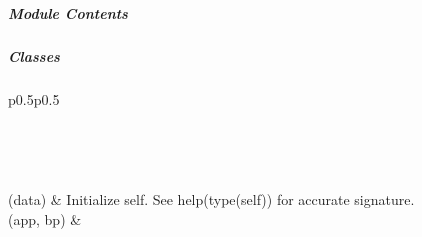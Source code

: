 \documentclass[letterpaper,10pt,english]{sphinxmanual}
\begin{document}
\subparagraph{Module Contents}
\label{\detokenize{autoapi/pine/backend/auth/eve/index:module-contents}}

\subparagraph{Classes}
\label{\detokenize{autoapi/pine/backend/auth/eve/index:classes}}

\begin{savenotes}\sphinxatlongtablestart\begin{longtable}[c]{p{0.5\linewidth}p{0.5\linewidth}}
\hline

\endfirsthead

%
{}\\
\hline

\endhead

\hline
{}\\
\endfoot

\endlastfoot

{\hyperref[\detokenize{autoapi/pine/backend/auth/eve/index:pine.backend.auth.eve.EveUser}]{}}(data)
&
Initialize self.  See help(type(self)) for accurate signature.
\\
\hline
{\hyperref[\detokenize{autoapi/pine/backend/auth/eve/index:pine.backend.auth.eve.EveModule}]{}}(app, bp)
&

\\
\hline
\end{longtable}\sphinxatlongtableend\end{savenotes}
\end{document}
